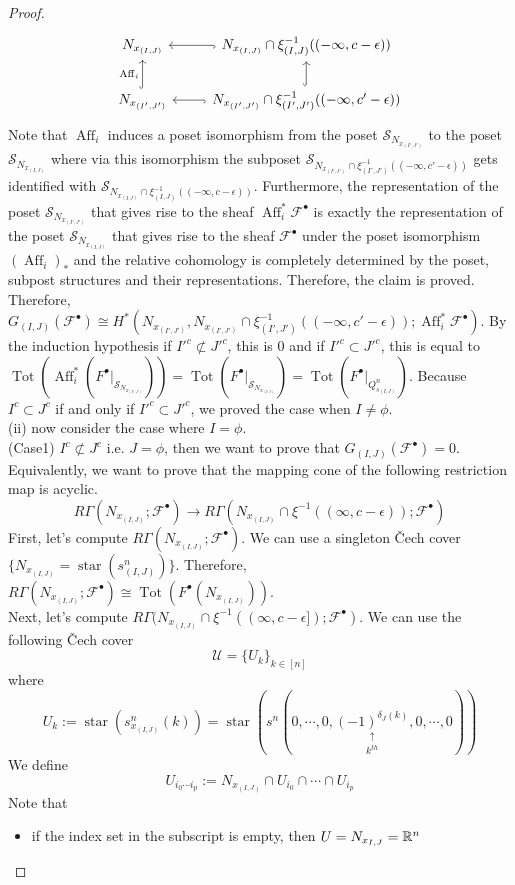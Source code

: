 \begin{proof}
\[\begin{tikzcd}
N_{x_{(I,J)}}   & N_{x_{(I,J)}} \cap \xi_{(I,J)}^{-1}((-\infty,c-\epsilon))\arrow[l, hook] \\
N_{x_{(I',J')}} \arrow[u, hook, "\operatorname{Aff}_i"]& N_{x_{(I',J')}}\cap \xi_{(I',J')}^{-1}((-\infty,c'-\epsilon))\arrow[l, hook]\arrow[u, hook] 
\end{tikzcd}
\]
Note that $\operatorname{Aff}_i$ induces a poset isomorphism from the poset $\mathcal{S}_{N_{x_{(I',J')}}}$ to the poset $\mathcal{S}_{N_{x_{(I,J)}}}$ where via this isomorphism the subposet $\mathcal{S}_{N_{x_{(I',J')}}\cap \xi_{(I',J')}^{-1}((-\infty,c'-\epsilon))}$ gets identified with $\mathcal{S}_{N_{x_{(I,J)}}\cap \xi_{(I,J)}^{-1}((-\infty,c-\epsilon))}$. Furthermore, the representation of the poset $\mathcal{S}_{N_{x_{(I',J')}}}$ that gives rise to the sheaf $\operatorname{Aff}_i^* \mathscr{F}^\bullet$ is exactly the representation of the poset $\mathcal{S}_{N_{x_{(I,J)}}}$ that gives rise to the sheaf $\mathscr{F}^\bullet$ under the poset isomorphism $(\operatorname{Aff}_i)_*$ and the relative cohomology is completely determined by the poset, subpost structures and their representations. Therefore, the claim is proved.\\
Therefore, $G_{(I,J)}(\mathscr{F}^\bullet) \cong H^*(N_{x_{(I',J')}}, N_{x_{(I',J')}}\cap \xi_{(I',J')}^{-1}((-\infty, c'-\epsilon)); \operatorname{Aff}_i^*\mathscr{F}^\bullet)$. By the induction hypothesis if $I'^c \not\subset J'^c$, this is $0$ and if $I'^c \subset J'^c$, this is equal to $\operatorname{Tot}(\operatorname{Aff}_i^*(F^\bullet |_{\mathcal{S}_{N_{x_{(I',J')}}}})) = \operatorname{Tot}(F^\bullet |_{\mathcal{S}_{N_{x_{(I,J)}}}}) = \operatorname{Tot}(F^\bullet |_{Q^n_{s_{(I,J)}}})$. Because $I^c\subset J^c$ if and only if $I'^c\subset J'^c$, we proved the case when $I\neq \phi$.\\
(ii) now consider the case where $I = \phi$.\\
(Case1) $I^c \not\subset J^c$ i.e. $J = \phi$, then we want to prove that $G_{(I,J)}(\mathscr{F}^\bullet)=0$. Equivalently, we want to prove that the mapping cone of the following restriction map is acyclic.
\[
R\Gamma(N_{x_{(I,J)}};\mathscr{F}^\bullet) \rightarrow R\Gamma(N_{x_{(I,J)}} \cap \xi^{-1}((\infty,c-\epsilon));\mathscr{F}^\bullet)
\]
First, let's compute $R\Gamma(N_{x_{(I,J)}};\mathscr{F}^\bullet)$. We can use a singleton \v{C}ech cover $\{N_{x_{(I,J)}} = \operatorname{star}(s^n_{(I,J)})\}$. Therefore, $R\Gamma(N_{x_{(I,J)}};\mathscr{F}^\bullet) \cong \operatorname{Tot}(F^\bullet(N_{x_{(I,J)}}))$.\\
Next, let's compute $R\Gamma(N_{x_{(I,J)}} \cap \xi^{-1}((\infty,c-\epsilon]);\mathscr{F}^\bullet)$. We can use the following \v{C}ech cover
\[
\mathcal{U}=\{U_k\}_{k\in [n]}
\]
where 
\[
U_k := \operatorname{star}(s^n_{x_{(I,J)}}(k)) = \operatorname{star}(s^n(0,\cdots,0,\underset{k^{th}}{\underset{\uparrow}{(-1)^{\delta_J(k)}}},0,\cdots,0))
\]
We define
\[
U_{i_0 \cdots i_p} := N_{x_{(I,J)}} \cap U_{i_0} \cap \cdots \cap U_{i_p}
\]
Note that 
\begin{itemize}
\item if the index set in the subscript is empty, then $U= N_{x_{I,J}} = \mathbb{R}^n$


\end{itemize}
\end{proof}
